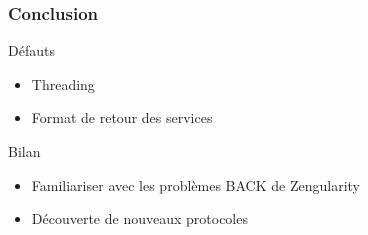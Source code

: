 
\begin{frame}
\frametitle{Conclusion}
  \begin{block}{Défauts}
    \begin{itemize}
     \item Threading
     \item Format de retour des services
    \end{itemize}    
  \end{block}
  
  \begin{block}{Bilan}
    \begin{itemize}
     \item Familiariser avec les problèmes BACK de Zengularity
     \item Découverte de nouveaux protocoles
    \end{itemize}    
  \end{block}
\end{frame}

